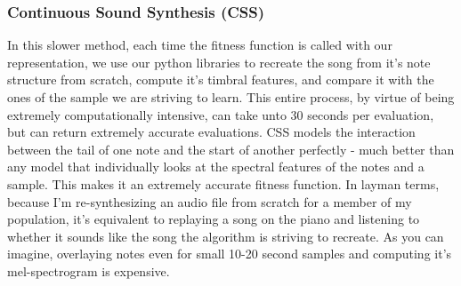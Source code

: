 \documentclass{pnastwo}
\begin{document}
\begin{article}
\subsubsection{Continuous Sound Synthesis (CSS)}
In this slower method, each time the fitness function is called with our representation, we use our python libraries to recreate the song from it's note structure from scratch, compute it's timbral features, and compare it with the ones of the sample we are striving to learn. This entire process, by virtue of being extremely computationally intensive, can take unto 30 seconds per evaluation, but can return extremely accurate evaluations. CSS models the interaction between the tail of one note and the start of another perfectly - much better than any model that individually looks at the spectral features of the notes and a sample. This makes it an extremely accurate fitness function. In layman terms, because I'm re-synthesizing an audio file from scratch for a member of my population, it's equivalent to replaying a song on the piano and listening to whether it sounds like the song the algorithm is striving to recreate. As you can imagine, overlaying notes even for small 10-20 second samples and computing it's mel-spectrogram is expensive.  


\end{article}
\end{document}
